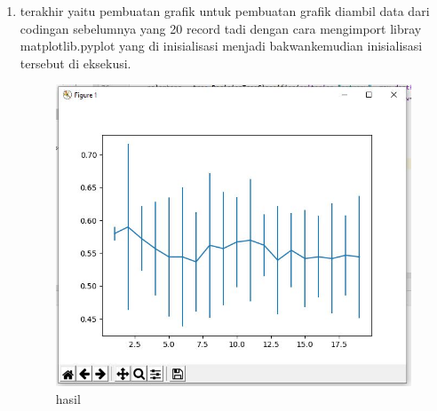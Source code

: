 \begin{enumerate}
\item terakhir yaitu pembuatan grafik untuk pembuatan grafik diambil data dari codingan sebelumnya yang 20 record tadi dengan cara mengimport libray matplotlib.pyplot yang di inisialisasi menjadi bakwankemudian inisialisasi tersebut di eksekusi.

\begin{figure}[ht]
\centering
\includegraphics[scale=0.5]{figures/1174042/chapter2/2,12.JPG}
\caption{hasil}
\label{contoh}
\end{figure}
\end{enumerate}

